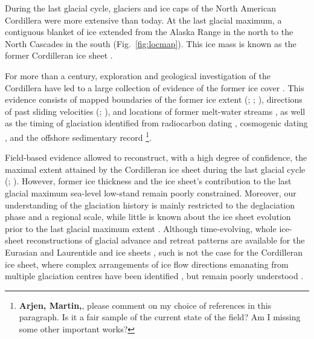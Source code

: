 \documentclass[tc, manuscript]{copernicus}
\begin{document}
\introduction
\label{sec:intro}

During the last glacial cycle, glaciers and ice caps of the North American
Cordillera were more extensive than today. At the last glacial maximum, a
contiguous blanket of ice extended from the Alaska Range in the north to the
North Cascades in the south (Fig.~\ref{fig:locmap}). This ice mass is known as
the former Cordilleran ice sheet \citep{Dawson.1888}.

For more than a century, exploration and geological investigation of the
Cordillera have led to a large collection of evidence of the former ice cover
\citep{Jackson.Clague.1991}. This evidence consists of mapped boundaries of the
former ice extent (\citealp[Fig.~1.12]{Clague.1989}; \citealp{Duk-Rodkin.1999};
\citealp{Dyke.2004}), directions of past sliding velocities
(\citealp{Prest.etal.1968}; \citealp[Fig.~2]{Kleman.etal.2010}), and locations
of former
melt-water streams \citep{Margold.etal.2011, Margold.etal.2013a}, as well as the
timing of glaciation identified from radiocarbon dating \citep[e.g.,][]
{Clague.1981, Porter.Swanson.1998}, cosmogenic dating \citep[e.g.,][]
{Ward.etal.2007, Menounos.etal.2008, Stroeven.etal.2010, Stroeven.etal.2014},
and the offshore sedimentary record \citep{Cosma.etal.2008, Davies.etal.2011}%
\footnote{\textbf{Arjen, Martin,}, please comment on my choice of references
    in this paragraph. Is it a fair sample of the current state of the field?
    Am I missing some other important works?}.

Field-based evidence allowed to reconstruct, with a high degree of confidence,
the maximal extent attained by the Cordilleran ice sheet during the last
glacial cycle (\citealp[Fig. 1.12]{Clague.1989}; \citealp{Dyke.2004}). However,
former ice thickness
and the ice sheet's contribution to the last glacial maximum sea-level
low-stand remain poorly constrained. Moreover, our understanding of the
glaciation history is mainly restricted to the deglaciation phase and a
regional scale, while little is known about the ice sheet evolution prior to
the last glacial maximum extent \citep[Fig.~6]{Kleman.etal.2010}. Although
time-evolving, whole ice-sheet reconstructions of glacial advance and retreat
patterns are available for the Eurasian and Laurentide and ice sheets
\citep{Kleman.etal.1997, Kleman.etal.2010}, such is not the case for the
Cordilleran ice sheet, where complex arrangements of ice flow directions
emanating from multiple glaciation centres have been identified
\citep[Fig.~1.12]{Prest.etal.1968, Clague.1989}, but remain poorly understood
\citep[p.~2049]{Kleman.etal.2010}.
\end{document}
